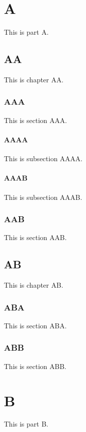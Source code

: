 \documentclass{book}
\begin{document}
\part{A}

This is part A.

\chapter{AA}

This is chapter AA.

\section{AAA}

This is section AAA.

\subsection{AAAA}

This is subsection AAAA.

\subsection{AAAB}

This is subsection AAAB.

\section{AAB}

This is section AAB.

\chapter{AB}

This is chapter AB.

\section{ABA}

This is section ABA.

\section{ABB}

This is section ABB.

\part{B}

This is part B.
\end{document}
